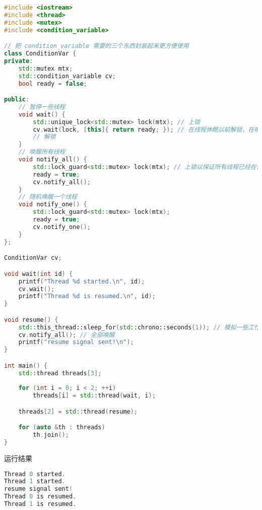 \begin{lstlisting}[language=cpp]
#include <iostream>
#include <thread>
#include <mutex>
#include <condition_variable>

// 把 condition_variable 需要的三个东西封装起来更方便使用
class ConditionVar {
private:
    std::mutex mtx;
    std::condition_variable cv;
    bool ready = false;

public:
    // 暂停一些线程
    void wait() {
        std::unique_lock<std::mutex> lock(mtx); // 上锁
        cv.wait(lock, [this]{ return ready; }); // 在线程休眠以前解锁，在唤醒时枪锁
        // 解锁
    }
    // 唤醒所有线程
    void notify_all() {
        std::lock_guard<std::mutex> lock(mtx); // 上锁以保证所有线程已经在休眠
        ready = true;
        cv.notify_all();
    }
    // 随机唤醒一个线程
    void notify_one() {
        std::lock_guard<std::mutex> lock(mtx);
        ready = true;
        cv.notify_one();
    }
};

ConditionVar cv;

void wait(int id) {
	printf("Thread %d started.\n", id);
    cv.wait();
	printf("Thread %d is resumed.\n", id);
}

void resume() {
    std::this_thread::sleep_for(std::chrono::seconds(1)); // 模拟一些工作
    cv.notify_all(); // 全部唤醒
    printf("resume signal sent!\n");
}

int main() {
    std::thread threads[3];
    
    for (int i = 0; i < 2; ++i)
        threads[i] = std::thread(wait, i);

    threads[2] = std::thread(resume);

    for (auto &th : threads)
        th.join();
}
\end{lstlisting}
运行结果
\begin{lstlisting}[language=cpp]
Thread 0 started.
Thread 1 started.
resume signal sent!
Thread 0 is resumed.
Thread 1 is resumed.
\end{lstlisting}
